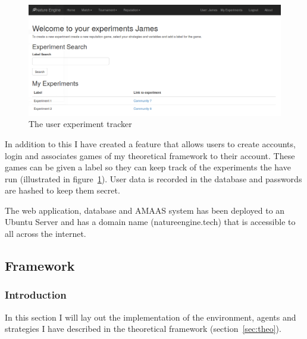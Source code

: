 \documentclass[]{final_report}
\begin{document}
\begin{figure}
\vspace{-30pt}
\begin{framed}
	\begin{center}
	\includegraphics[width=\textwidth]{UserExperiments.png}
	\caption{The user experiment tracker}
	\label{fig:user_experiments}
	\end{center}
\end{framed}
\vspace{-30pt}
\end{figure}
In addition to this I have created a feature that allows users to create accounts, login and associates games of my theoretical framework to their account. These games can be given a label so they can keep track of the experiments the have run (illustrated in figure~\ref{fig:user_experiments}). User data is recorded in the database and passwords are hashed to keep them secret.\par
The web application, database and AMAAS system has been deployed to an Ubuntu Server and has a domain name (natureengine.tech) that is accessible to all across the internet.

\subsection{Framework}
\subsubsection{Introduction}
In this section I will lay out the implementation of the environment, agents and strategies I have described in the theoretical framework (section~\ref{sec:theo}). 
\end{document}
